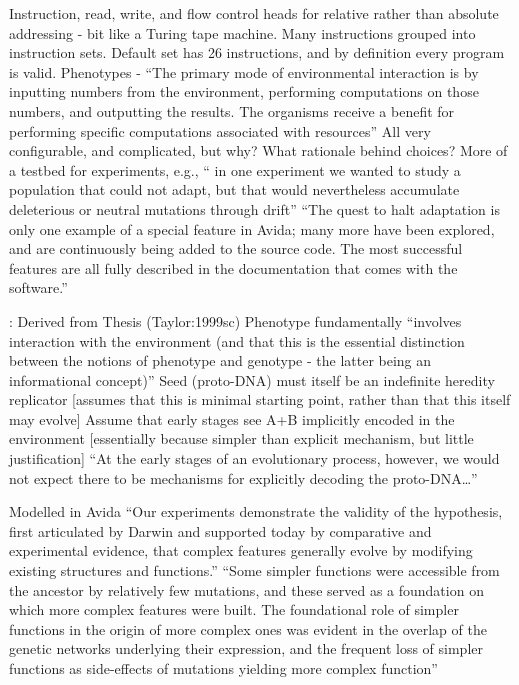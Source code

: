 Instruction, read, write, and flow control heads for relative rather than absolute addressing - bit like a Turing tape machine. Many instructions grouped into instruction sets. Default set has 26 instructions, and by definition every program is valid.
Phenotypes - ``The primary mode of environmental interaction is by inputting numbers from the environment, performing computations on those numbers, and outputting the results. The organisms receive a
benefit for performing specific computations associated with resources''
All very configurable, and complicated, but why? What rationale behind choices? More of a testbed for experiments, e.g., `` in one experiment we wanted to study a population that could not adapt, but that would nevertheless accumulate deleterious or neutral mutations through drift''
``The quest to halt adaptation is only one example of a special feature in Avida; many more have been explored, and are continuously being added to the source code. The most successful features are all fully described in the documentation that comes with the software.''

\autocite{Taylor2001}:
Derived from Thesis (Taylor:1999sc)
Phenotype fundamentally ``involves interaction with the environment (and that this is the essential distinction between the notions of phenotype and genotype - the latter being an informational concept)'' \autocite{Taylor2001}
Seed (proto-DNA) must itself be an indefinite heredity replicator {[}assumes that this is minimal starting point, rather than that this itself may evolve{]} \autocite{Taylor2001}
Assume that early stages see A+B implicitly encoded in the environment {[}essentially because simpler than explicit mechanism, but little justification{]} ``At the early stages of an evolutionary process, however, we would not expect there to be mechanisms for explicitly decoding the proto-DNA\ldots{}'' \autocite{Taylor2001}

\autocite{Lenski2003}
Modelled in Avida
``Our experiments demonstrate the validity of the hypothesis, first articulated by Darwin and supported today by comparative and experimental evidence, that complex features generally evolve by
modifying existing structures and functions.''
``Some simpler functions were accessible from the ancestor by relatively few mutations, and these served as a foundation on which more complex features were built. The foundational role of simpler functions in the origin of more complex ones was evident in the overlap of the genetic networks underlying their expression, and the frequent loss of simpler functions as side-effects of mutations yielding more complex function''

